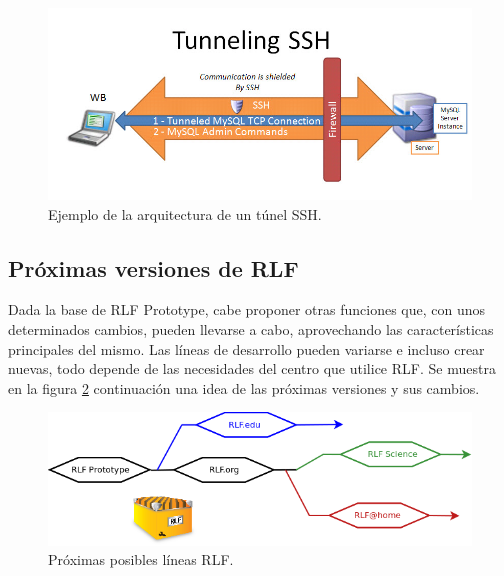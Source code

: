 \begin{figure}[H]
	\centering
	\includegraphics[scale=0.7]{images/ssh.png}
	\caption[Túnel SSH]{Ejemplo de la arquitectura de un túnel SSH.}
	\label{fig:ssh}
\end{figure}

\subsection{Próximas versiones de RLF}
Dada la base de RLF Prototype, cabe proponer otras funciones que, con unos 
determinados cambios, pueden llevarse a cabo, aprovechando las 
características principales del mismo. Las líneas de desarrollo 
pueden variarse e incluso crear nuevas, todo depende de las necesidades 
del centro que utilice RLF. Se muestra en la figura \ref{fig:versiones} 
continuación una idea de las próximas versiones y sus cambios.

\begin{figure}[H]
	\centering
	\includegraphics[scale=0.7]{images/versiones.png}
	\caption[Próximas líneas RLF]{Próximas posibles líneas RLF.}
	\label{fig:versiones}
\end{figure}

